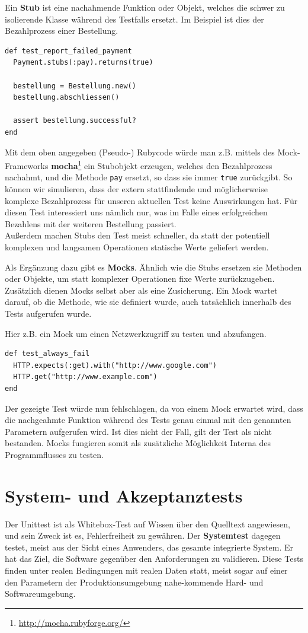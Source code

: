   Ein \textbf{Stub} ist eine nachahmende Funktion oder Objekt, welches die schwer zu isolierende Klasse während des Testfalls ersetzt. Im Beispiel ist dies der Bezahlprozess einer Bestellung. %
  \begin{lstlisting}
def test_report_failed_payment
  Payment.stubs(:pay).returns(true)

  bestellung = Bestellung.new()
  bestellung.abschliessen()

  assert bestellung.successful?
end
  \end{lstlisting}
  Mit dem oben angegeben (Pseudo-) Rubycode würde man z.B. mittels des Mock-Frameworks \textbf{mocha}\footnote{\url{http://mocha.rubyforge.org/}} ein Stubobjekt erzeugen, welches den Bezahlprozess nachahmt, und die Methode \texttt{pay} ersetzt, so dass sie immer \texttt{true} zurückgibt. So können wir simulieren, dass der extern stattfindende und möglicherweise komplexe Bezahlprozess für unseren aktuellen Test keine Auswirkungen hat. Für diesen Test interessiert uns nämlich nur, was im Falle eines erfolgreichen Bezahlens mit der weiteren Bestellung passiert.\\
  Außerdem machen Stubs den Test meist schneller, da statt der potentiell komplexen und langsamen Operationen statische Werte geliefert werden.

  Als Ergänzung dazu gibt es \textbf{Mocks}. Ähnlich wie die Stubs ersetzen sie Methoden oder Objekte, um statt komplexer Operationen fixe Werte zurückzugeben. Zusätzlich dienen Mocks selbst aber als eine Zusicherung. Ein Mock wartet darauf, ob die Methode, wie sie definiert wurde, auch tatsächlich innerhalb des Tests aufgerufen wurde.

  Hier z.B. ein Mock um einen Netzwerkzugriff zu testen und abzufangen. %
  \begin{lstlisting}
def test_always_fail
  HTTP.expects(:get).with("http://www.google.com")
  HTTP.get("http://www.example.com")
end
  \end{lstlisting}
  Der gezeigte Test würde nun fehlschlagen, da von einem Mock erwartet wird, dass die nachgeahmte Funktion während des Tests genau einmal mit den genannten Parametern aufgerufen wird. Ist dies nicht der Fall, gilt der Test als nicht bestanden. Mocks fungieren somit als zusätzliche Möglichkeit Interna des Programmflusses zu testen.

\section{System- und Akzeptanztests}
\label{sec:acceptance}
Der Unittest ist als Whitebox-Test auf Wissen über den Quelltext angewiesen, und sein Zweck ist es, Fehlerfreiheit zu gewähren. Der \textbf{Systemtest} dagegen testet, meist aus der Sicht eines Anwenders, das gesamte integrierte System. Er hat das Ziel, die Software gegenüber den Anforderungen zu validieren. Diese Tests finden unter realen Bedingungen mit realen Daten statt, meist sogar auf einer den Parametern der Produktionsumgebung nahe-kommende Hard- und Softwareumgebung.

